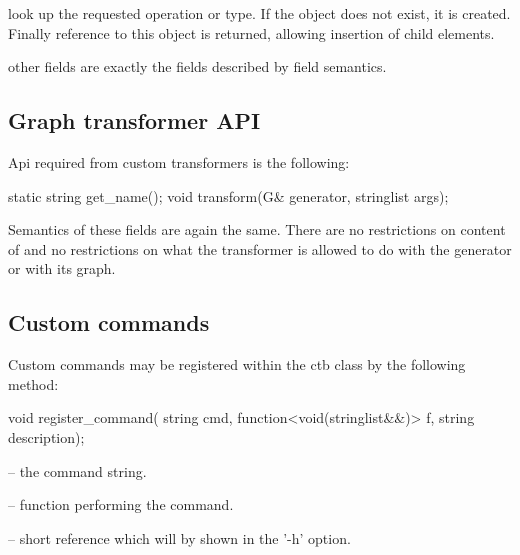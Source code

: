 \begin{description}
  \item {} look up the requested operation or type. If the object does not exist, it is created. Finally reference to this object is returned, allowing insertion of child elements.
  \item other fields are exactly the fields described by field semantics.
\end{description}

\subsection{Graph transformer API}

Api required from custom transformers is the following:
\begin{code}
 static string get_name();
 void transform(G& generator, stringlist args);
\end{code}

Semantics of these fields are again the same. There are no restrictions on content of  and no restrictions on what the transformer is allowed to do with the generator or with its graph.


\subsection{Custom commands}

Custom commands may be registered within the ctb class by the following method:
\begin{code}
void register_command( string cmd, function<void(stringlist&&)> f,
  string description);
\end{code}

\begin{description}
\item {} -- the command string.
\item {} -- function performing the command.
\item {} -- short reference which will by shown in the '-h' option.
\end{description}

  


